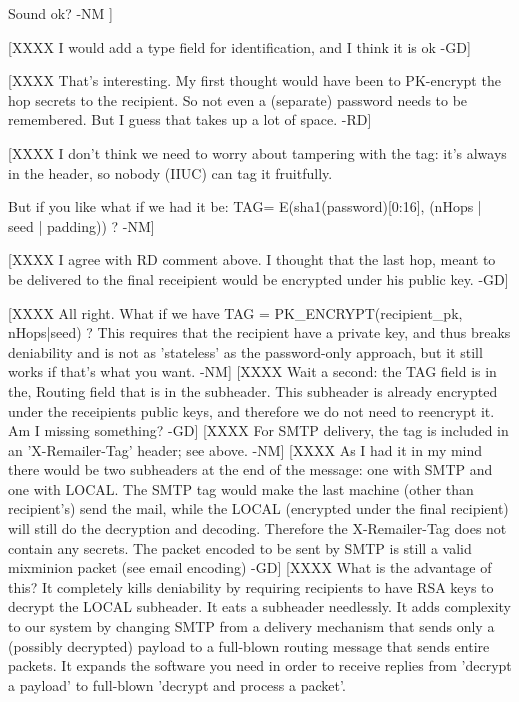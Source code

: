          Sound ok?                                 -NM ]

[XXXX I would add a type field for identification, and I think it is
ok -GD]

[XXXX That's interesting. My first thought would have been to PK-encrypt
      the hop secrets to the recipient. So not even a (separate) password
      needs to be remembered. But I guess that takes up a lot of
      space. -RD]

[XXXX I don't think we need to worry about tampering with the tag:
      it's always in the header, so nobody (IIUC) can tag it fruitfully.

      But if you like what if we had it be:
        TAG= E(sha1(password)[0:16],  (nHops | seed | padding)) ? -NM]

[XXXX I agree with RD comment above.  I thought that the last hop, meant
 to be delivered to the final receipient would be encrypted under his public 
 key. -GD]

[XXXX All right.  What if we have 
         TAG = PK_ENCRYPT(recipient_pk, nHops|seed) ?  
      This requires
      that the recipient have a private key, and thus breaks
      deniability and is not as 'stateless' as the password-only
      approach, but it still works if that's what you want.  -NM]
[XXXX Wait a second: the TAG field is in the, Routing field that is in the 
      subheader. This subheader is already encrypted under the receipients
      public keys, and therefore we do not need to reencrypt it.
      Am I missing something? -GD]
[XXXX For SMTP delivery, the tag is included in an 'X-Remailer-Tag'
      header; see above. -NM]
[XXXX As I had it in my mind there would be two subheaders at the end
         of the message: one with SMTP and one with LOCAL. The SMTP
         tag would make the last machine (other than recipient's) send
         the mail, while the LOCAL (encrypted under the final
         recipient) will still do the decryption and
         decoding. Therefore the X-Remailer-Tag does not contain any
         secrets. The packet encoded to be sent by SMTP is still a
         valid mixminion packet (see email encoding) -GD]
[XXXX What is the advantage of this?  It completely kills deniability
      by requiring recipients to have RSA keys to decrypt the LOCAL
      subheader.  It eats a subheader needlessly.  It adds
      complexity to our system by changing SMTP from a delivery
      mechanism that sends only a (possibly decrypted) payload to a
      full-blown routing message that sends entire packets.  It
      expands the software you need in order to receive replies from
      'decrypt a payload' to full-blown 'decrypt and process a packet'. 

